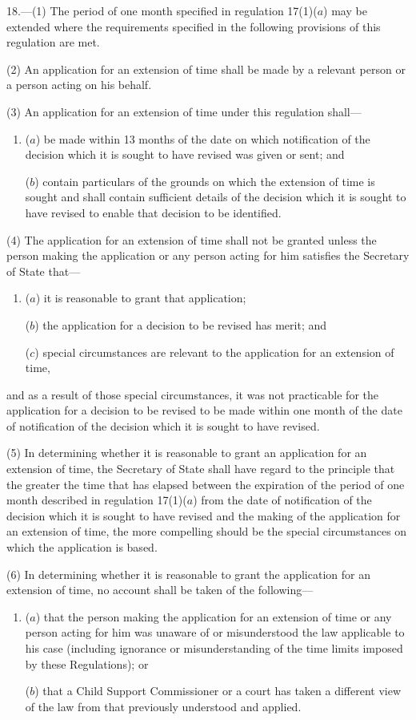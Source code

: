\documentclass[a4paper,12pt]{article}
\begin{document}
18.—(1) The period of one month specified in regulation 17(1)($a$) may be extended where the requirements specified in the following provisions of this regulation are met.

(2) An application for an extension of time shall be made by a relevant person or a person acting on his behalf.

(3) An application for an extension of time under this regulation shall---
\begin{enumerate}\item[]
($a$) be made within 13 months of the date on which notification of the decision which it is sought to have revised was given or sent; and

($b$) contain particulars of the grounds on which the extension of time is sought and shall contain sufficient details of the decision which it is sought to have revised to enable that decision to be identified.
\end{enumerate}

(4) The application for an extension of time shall not be granted unless the person making the application or any person acting for him satisfies the Secretary of State that---
\begin{enumerate}\item[]
($a$) it is reasonable to grant that application;

($b$) the application for a decision to be revised has merit; and

($c$) special circumstances are relevant to the application for an extension of time,
\end{enumerate}
and as a result of those special circumstances, it was not practicable for the application for a decision to be revised to be made within one month of the date of notification of the decision which it is sought to have revised.

(5) In determining whether it is reasonable to grant an application for an extension of time, the Secretary of State shall have regard to the principle that the greater the time that has elapsed between the expiration of the period of one month described in regulation 17(1)($a$) from the date of notification of the decision which it is sought to have revised and the making of the application for an extension of time, the more compelling should be the special circumstances on which the application is based.

(6) In determining whether it is reasonable to grant the application for an extension of time, no account shall be taken of the following---
\begin{enumerate}\item[]
($a$) that the person making the application for an extension of time or any person acting for him was unaware of or misunderstood the law applicable to his case (including ignorance or misunderstanding of the time limits imposed by these Regulations); or

($b$) that a Child Support Commissioner or a court has taken a different view of the law from that previously understood and applied.
\end{enumerate}
\end{document}

